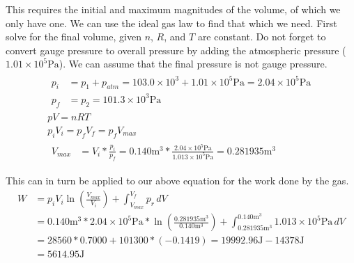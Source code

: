 \documentclass[12pt]{article}
\begin{document}
            This requires the initial and maximum magnitudes of the volume, of which we only have one. 
            We can use the ideal gas law to find that which we need.
            First solve for the final volume, given $n$, $R$, and $T$ are constant.
            Do not forget to convert gauge pressure to overall pressure by adding the atmospheric pressure ($1.01 \times 10^5 \unit{\pascal}$).
            We can assume that the final pressure is not gauge pressure.
            \begin{gather}
                \begin{align}
                    p_i &=  p_1 + p_{atm}
                        =   103.0 \times 10^3 + 1.01 \times 10^5 \unit{\pascal}
                        =   2.04 \times 10^5 \unit{\pascal}\\
                    p_f &=  p_2 %
                        =   101.3 \times 10^3 \unit{\pascal} %
                \end{align}\\
                pV  =   nRT\\
                p_i V_i =   p_f V_f =   p_f V_{max}\\
                \begin{align}
                    V_{max} &=  V_i * \frac{p_i}{p_f}
                        =   0.140 \unit{\meter^3} * \frac{2.04 \times 10^5 \unit{\pascal}}{1.013 \times 10^5 \unit{\pascal}}
                        =   0.281935 \unit{\meter^3}
                \end{align}
            \end{gather}

            This can in turn be applied to our above equation for the work done by the gas.
            {\footnotesize
            \begin{align}
                W   &=  p_i V_i \ln\left( \frac{V_{max}}{V_i} \right) + \int_{V_{max}}^{V_f} p_r\,dV\\
                    &=  0.140 \unit{\meter^3} * 2.04 \times 10^5 \unit{\pascal} * \ln\left( \frac{0.281935 \unit{\meter^3}}{0.140 \unit{\meter^3}} \right)
                            + \int_{0.281935 \unit{\meter^3}}^{0.140 \unit{\meter^3}} 1.013 \times 10^5 \unit{\pascal} \,dV\\
                    &=  28560 * 0.7000 + 101300 * (-0.1419)
                    =   19992.96 \unit{\joule} - 14378 \unit{\joule}\\
                    &=  \boxed{5614.95 \unit{\joule}}
            \end{align}}
\end{document}
